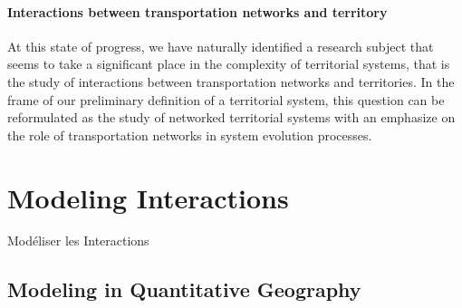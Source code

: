 \paragraph{Interactions between transportation networks and territory}

At this state of progress, we have naturally identified a research subject that seems to take a significant place in the complexity of territorial systems, that is the study of interactions between transportation networks and territories. In the frame of our preliminary definition of a territorial system, this question can be reformulated as the study of networked territorial systems with an emphasize on the role of transportation networks in system evolution processes.





\newpage

\section{Modeling Interactions}{Modéliser les Interactions}


\subsection{Modeling in Quantitative Geography}




